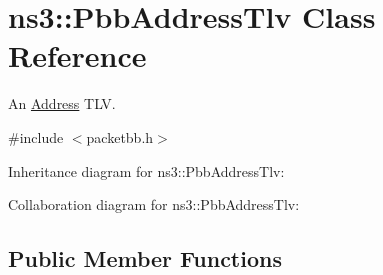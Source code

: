 \hypertarget{classns3_1_1PbbAddressTlv}{}\section{ns3\+:\+:Pbb\+Address\+Tlv Class Reference}
\label{classns3_1_1PbbAddressTlv}


An \hyperlink{classns3_1_1Address}{Address} T\+LV.  




{\ttfamily \#include $<$packetbb.\+h$>$}



Inheritance diagram for ns3\+:\+:Pbb\+Address\+Tlv\+:


Collaboration diagram for ns3\+:\+:Pbb\+Address\+Tlv\+:
\subsection*{Public Member Functions}
